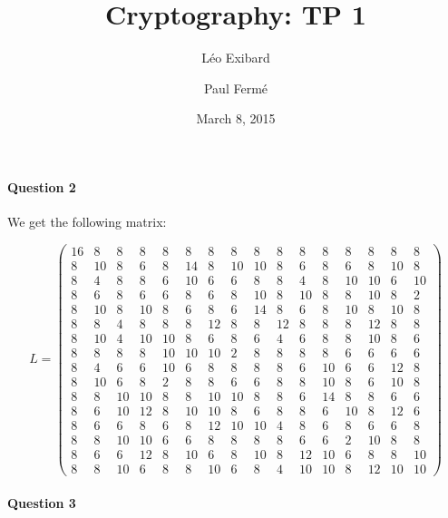 \documentclass[a4paper]{article}
\date{March 8, 2015}
\author{Léo Exibard \and Paul Fermé}
\title{Cryptography: TP 1}
\begin{document}
\maketitle

\paragraph{Question 2}

We get the following matrix:

\begin{equation*}
L = \left(
\begin{array}{cccccccccccccccc}
16 & 8 & 8 & 8 & 8 & 8 & 8 & 8 & 8 & 8 & 8 & 8 & 8 & 8 & 8 & 8 \\
8 & 10 & 8 & 6 & 8 & 14 & 8 & 10 & 10 & 8 & 6 & 8 & 6 & 8 & 10 & 8 \\
8 & 4 & 8 & 8 & 6 & 10 & 6 & 6 & 8 & 8 & 4 & 8 & 10 & 10 & 6 & 10 \\
8 & 6 & 8 & 6 & 6 & 8 & 6 & 8 & 10 & 8 & 10 & 8 & 8 & 10 & 8 & 2 \\
8 & 10 & 8 & 10 & 8 & 6 & 8 & 6 & 14 & 8 & 6 & 8 & 10 & 8 & 10 & 8 \\
8 & 8 & 4 & 8 & 8 & 8 & 12 & 8 & 8 & 12 & 8 & 8 & 8 & 12 & 8 & 8 \\
8 & 10 & 4 & 10 & 10 & 8 & 6 & 8 & 6 & 4 & 6 & 8 & 8 & 10 & 8 & 6 \\
8 & 8 & 8 & 8 & 10 & 10 & 10 & 2 & 8 & 8 & 8 & 8 & 6 & 6 & 6 & 6 \\
8 & 4 & 6 & 6 & 10 & 6 & 8 & 8 & 8 & 8 & 6 & 10 & 6 & 6 & 12 & 8 \\
8 & 10 & 6 & 8 & 2 & 8 & 8 & 6 & 6 & 8 & 8 & 10 & 8 & 6 & 10 & 8 \\
8 & 8 & 10 & 10 & 8 & 8 & 10 & 10 & 8 & 8 & 6 & 14 & 8 & 8 & 6 & 6 \\
8 & 6 & 10 & 12 & 8 & 10 & 10 & 8 & 6 & 8 & 8 & 6 & 10 & 8 & 12 & 6 \\
8 & 6 & 6 & 8 & 6 & 8 & 12 & 10 & 10 & 4 & 8 & 6 & 8 & 6 & 6 & 8 \\
8 & 8 & 10 & 10 & 6 & 6 & 8 & 8 & 8 & 8 & 6 & 6 & 2 & 10 & 8 & 8 \\
8 & 6 & 6 & 12 & 8 & 10 & 6 & 8 & 10 & 8 & 12 & 10 & 6 & 8 & 8 & 10 \\
8 & 8 & 10 & 6 & 8 & 8 & 10 & 6 & 8 & 4 & 10 & 10 & 8 & 12 & 10 & 10
\end{array}
\right)
\end{equation*}

\paragraph{Question 3}
\end{document}
